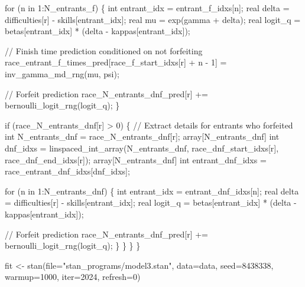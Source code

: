 \documentclass[
  letterpaper,
  DIV=11,
  numbers=noendperiod]{scrartcl}
\newenvironment{Shaded}{\begin{snugshade}}{\end{snugshade}}
\newcommand{\AttributeTok}[1]{\textcolor[rgb]{0.40,0.45,0.13}{#1}}
\newcommand{\CommentTok}[1]{\textcolor[rgb]{0.37,0.37,0.37}{#1}}
\newcommand{\ControlFlowTok}[1]{\textcolor[rgb]{0.00,0.23,0.31}{#1}}
\newcommand{\DataTypeTok}[1]{\textcolor[rgb]{0.68,0.00,0.00}{#1}}
\newcommand{\DecValTok}[1]{\textcolor[rgb]{0.68,0.00,0.00}{#1}}
\newcommand{\FunctionTok}[1]{\textcolor[rgb]{0.28,0.35,0.67}{#1}}
\newcommand{\NormalTok}[1]{\textcolor[rgb]{0.00,0.23,0.31}{#1}}
\newcommand{\OtherTok}[1]{\textcolor[rgb]{0.00,0.23,0.31}{#1}}
\newcommand{\StringTok}[1]{\textcolor[rgb]{0.13,0.47,0.30}{#1}}
\begin{document}
\begin{codelisting}
\begin{Shaded}
\begin{Highlighting}[]
    \ControlFlowTok{for}\NormalTok{ (n }\ControlFlowTok{in} \DecValTok{1}\NormalTok{:N\_entrants\_f) \{}
      \DataTypeTok{int}\NormalTok{ entrant\_idx = entrant\_f\_idxs[n];}
      \DataTypeTok{real}\NormalTok{ delta = difficulties[r] {-} skills[entrant\_idx];}
      \DataTypeTok{real}\NormalTok{ mu = exp(gamma + delta);}
      \DataTypeTok{real}\NormalTok{ logit\_q = betas[entrant\_idx] * (delta {-} kappas[entrant\_idx]);}

      \CommentTok{// Finish time prediction conditioned on not forfeiting}
\NormalTok{      race\_entrant\_f\_times\_pred[race\_f\_start\_idxs[r] + n {-} }\DecValTok{1}\NormalTok{]}
\NormalTok{        = inv\_gamma\_md\_rng(mu, psi);}

      \CommentTok{// Forfeit prediction}
\NormalTok{      race\_N\_entrants\_dnf\_pred[r] += bernoulli\_logit\_rng(logit\_q);}
\NormalTok{    \}}

    \ControlFlowTok{if}\NormalTok{ (race\_N\_entrants\_dnf[r] \textgreater{} }\DecValTok{0}\NormalTok{) \{}
      \CommentTok{// Extract details for entrants who forfeited}
      \DataTypeTok{int}\NormalTok{ N\_entrants\_dnf = race\_N\_entrants\_dnf[r];}
      \DataTypeTok{array}\NormalTok{[N\_entrants\_dnf]}
        \DataTypeTok{int}\NormalTok{ dnf\_idxs = linspaced\_int\_array(N\_entrants\_dnf,}
\NormalTok{                                           race\_dnf\_start\_idxs[r],}
\NormalTok{                                           race\_dnf\_end\_idxs[r]);}
      \DataTypeTok{array}\NormalTok{[N\_entrants\_dnf]}
        \DataTypeTok{int}\NormalTok{ entrant\_dnf\_idxs = race\_entrant\_dnf\_idxs[dnf\_idxs];}

      \ControlFlowTok{for}\NormalTok{ (n }\ControlFlowTok{in} \DecValTok{1}\NormalTok{:N\_entrants\_dnf) \{}
        \DataTypeTok{int}\NormalTok{ entrant\_idx = entrant\_dnf\_idxs[n];}
        \DataTypeTok{real}\NormalTok{ delta = difficulties[r] {-} skills[entrant\_idx];}
        \DataTypeTok{real}\NormalTok{ logit\_q = betas[entrant\_idx] * (delta {-} kappas[entrant\_idx]);}

        \CommentTok{// Forfeit prediction}
\NormalTok{        race\_N\_entrants\_dnf\_pred[r] += bernoulli\_logit\_rng(logit\_q);}
\NormalTok{      \}}
\NormalTok{    \}}
\NormalTok{  \}}
\NormalTok{\}}
\end{Highlighting}
\end{Shaded}

\end{codelisting}

\begin{Shaded}
\begin{Highlighting}[]
\NormalTok{fit }\OtherTok{\textless{}{-}} \FunctionTok{stan}\NormalTok{(}\AttributeTok{file=}\StringTok{"stan\_programs/model3.stan"}\NormalTok{,}
            \AttributeTok{data=}\NormalTok{data, }\AttributeTok{seed=}\DecValTok{8438338}\NormalTok{,}
            \AttributeTok{warmup=}\DecValTok{1000}\NormalTok{, }\AttributeTok{iter=}\DecValTok{2024}\NormalTok{, }\AttributeTok{refresh=}\DecValTok{0}\NormalTok{)}
\end{Highlighting}
\end{Shaded}
\end{document}
